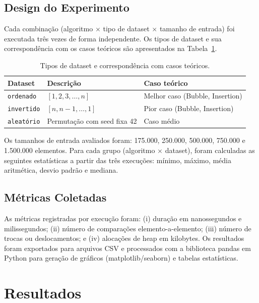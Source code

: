 \documentclass[12pt]{article}
\begin{document}
\subsection{Design do Experimento}

Cada combinação (algoritmo $\times$ tipo de dataset $\times$
tamanho de entrada) foi executada três vezes de forma independente.
Os tipos de dataset e sua correspondência com os casos teóricos
são apresentados na Tabela~\ref{tab:datasets}.

\begin{table}[ht]
\centering
\caption{Tipos de dataset e correspondência com casos teóricos.}
\label{tab:datasets}
\begin{tabular}{lll}
\toprule
\textbf{Dataset} & \textbf{Descrição} & \textbf{Caso teórico} \\
\midrule
\texttt{ordenado}  & $[1, 2, 3, \ldots, n]$         & Melhor caso (Bubble, Insertion) \\
\texttt{invertido} & $[n, n{-}1, \ldots, 1]$        & Pior caso (Bubble, Insertion) \\
\texttt{aleatório} & Permutação com seed fixa 42     & Caso médio \\
\bottomrule
\end{tabular}
\end{table}

Os tamanhos de entrada avaliados foram: 175.000, 250.000,
500.000, 750.000 e 1.500.000 elementos. Para cada grupo
(algoritmo $\times$ dataset), foram calculadas as seguintes
estatísticas a partir das três execuções: mínimo, máximo,
média aritmética, desvio padrão e mediana.

\subsection{Métricas Coletadas}

As métricas registradas por execução foram: (i) duração em
nanossegundos e milissegundos; (ii) número de comparações
elemento-a-elemento; (iii) número de trocas ou deslocamentos;
e (iv) alocações de heap em kilobytes. Os resultados foram
exportados para arquivos CSV e processados com a biblioteca
pandas em Python para geração de gráficos (matplotlib/seaborn)
e tabelas estatísticas.

\section{Resultados}
\label{sec:results}
\end{document}
